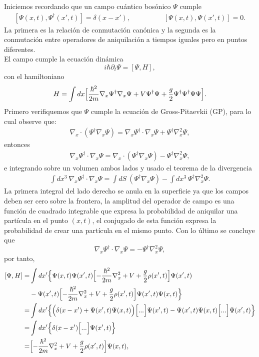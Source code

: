 Iniciemos recordando que un campo cu\'{a}ntico bos\'{o}nico  $\Psi$ cumple
\begin{eqnarray}\label{conmutador}
[\Psi(x,t),\Psi^{\dagger}(x',t)]=\delta(x-x'), \hspace{2cm} [\Psi(x,t),\Psi(x',t)]=0.
\end{eqnarray}
La primera es la relaci\'{o}n de conmutaci\'{o}n  can\'{o}nica y la segunda  es la conmutaci\'{o}n entre operadores de aniquilaci\'{o}n a tiempos iguales pero en puntos diferentes.\\
El campo cumple la ecuaci\'{o}n din\'{a}mica
\begin{equation}\label{ec:GP1}
i\hbar \partial_t \Psi=[\Psi,H],
\end{equation}
con el hamiltoniano
\begin{equation}
H=\int dx \Bigl[\frac{\hbar^2}{2m}\nabla_x\Psi^{\dagger} \nabla_x \Psi+ V\Psi^{\dagger}\Psi+\frac{g}{2}\Psi^{\dagger}\Psi^{\dagger}\Psi\Psi\Bigr].
\end{equation}
Primero verifiquemos que $\Psi$ cumple la ecuaci\'{o}n de Gross-Pitaevkii (GP), para lo cual observe que:
\begin{align*}
\nabla_x\cdot(\Psi^{\dagger}\nabla_x \Psi)=\nabla_x \Psi^{\dagger}\cdot\nabla_x\Psi+\Psi^{\dagger}\nabla_x^2\Psi,
\end{align*}
entonces
\begin{align*}
\nabla_x \Psi^{\dagger}\cdot \nabla_x\Psi=\nabla_x\cdot(\Psi^{\dagger}\nabla_x \Psi)-\Psi^{\dagger}\nabla_x^2\Psi,
\end{align*}
e integrando sobre un volumen ambos lados y usado el teorema de la divergencia
\begin{align*}
\int dx^3\ \nabla_x \Psi^{\dagger}\cdot\nabla_x\Psi=\int dS\ (\Psi^{\dagger}\nabla_x \Psi)-\int dx^3 \ \Psi^{\dagger}\nabla_x^2\Psi.
\end{align*}
La primera integral del lado derecho se anula en la superficie ya que los campos deben ser cero sobre la frontera, la amplitud del operador de campo es una funci\'{o}n de cuadrado integrable que expresa la probabilidad de aniquilar una part\'{i}cula en el punto $(x,t)$, el conjugado de esta funci\'{o}n expresa la probabilidad de crear una part\'{i}cula en el mismo punto. Con lo \'{u}ltimo se concluye que
\begin{equation}
\nabla_x \Psi^{\dagger}\cdot\nabla_x\Psi=-\Psi^{\dagger}\nabla_x^2\Psi,
\end{equation}
por tanto,
\begin{align}
\nonumber [\Psi,H]=&\int dx'\Bigl\{\Psi(x,t)\Psi(x',t)\Bigl[-\frac{\hbar^2}{2m}\nabla_x^2 + V+\frac{g}{2}\rho(x',t)\Bigr]\Psi(x',t)\\
\nonumber&-\Psi(x',t)\Bigl[-\frac{\hbar^2}{2m}\nabla_x^2 + V+\frac{g}{2}\rho(x',t)\Bigr]\Psi(x',t)\Psi(x,t)\Bigr\}\\
\nonumber=&\int dx'\Bigl\{ \Bigl(\delta(x-x')+\Psi(x',t)\Psi(x,t)\Bigr)\Big[...\Big]\Psi(x',t)-\Psi(x',t)\Psi(x,t)\Bigl[...\Bigr]\Psi(x',t)\Bigr\}\\
\nonumber =&\int dx'\Bigl\{ \delta(x-x')\Bigl[...\Bigr]\Psi(x',t)\Bigr\}\\
=&\Bigl[-\frac{\hbar^2}{2m}\nabla_x^2 + V+\frac{g}{2}\rho(x',t)\Bigr]\Psi(x,t),
\end{align}
